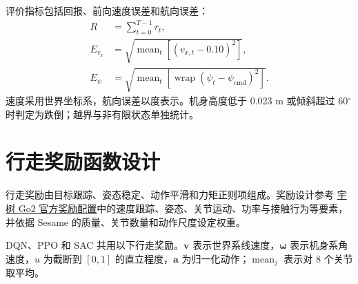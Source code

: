 \documentclass[UTF8,a4paper,zihao=5,fontset=fandol]{ctexart}
\begin{document}
评价指标包括回报、前向速度误差和航向误差：
\begin{align}
 R &= \sum_{t=0}^{T-1}r_t,\\
 E_{v_x} &= \sqrt{\operatorname{mean}_t[(v_{x,t}-0.10)^2]},\\
 E_{\psi} &= \sqrt{\operatorname{mean}_t[\operatorname{wrap}(\psi_t-\psi_{\mathrm{cmd}})^2]}.
\end{align}
速度采用世界坐标系，航向误差以度表示。机身高度低于 0.023 m 或倾斜超过 60\(^{\circ}\)时判定为跌倒；越界与非有限状态单独统计。

\FloatBarrier
\section{行走奖励函数设计}

行走奖励由目标跟踪、姿态稳定、动作平滑和力矩正则项组成。奖励设计参考 \href{https://github.com/unitreerobotics/unitree_rl_lab/blob/main/source/unitree_rl_lab/unitree_rl_lab/tasks/locomotion/robots/go2/velocity_env_cfg.py}{宇树 Go2 官方奖励配置}中的速度跟踪、姿态、关节运动、功率与接触行为等要素，并依据 Sesame 的质量、关节数量和动作尺度设定权重。

DQN、PPO 和 SAC 共用以下行走奖励。\(\mathbf v\) 表示世界系线速度，\(\boldsymbol\omega\) 表示机身系角速度，\(u\) 为截断到 \([0,1]\) 的直立程度，\(\mathbf a\) 为归一化动作；\(\operatorname{mean}_j\) 表示对 8 个关节取平均。
\end{document}

